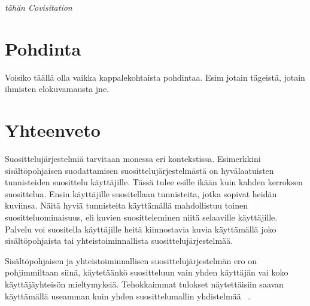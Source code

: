 \documentclass[12pt,finnish]{tktltiki2}
\theoremstyle{definition}
\theoremstyle{remark}
\begin{document}
\textit{tähän Covisitation}

\section{Pohdinta}
Voisiko täällä olla vaikka kappalekohtaista pohdintaa. Esim jotain tägeistä, jotain ihmisten elokuvamausta jne.

        
\section{Yhteenveto}

Suosittelujärjestelmiä tarvitaan monessa eri kontekstissa. Esimerkkini sisältöpohjaisen suodattamisen suosittelujärjestelmästä on hyvälaatuisten tunnisteiden suosittelu käyttäjille. Tässä tulee esille ikään kuin kahden kerroksen suosittelua. Ensin käyttäjille suositellaan tunnisteita, jotka sopivat heidän kuviinsa. Näitä hyviä tunnisteita käyttämällä mahdollistuu toinen suositteluominaisuus, eli kuvien suositteleminen niitä selaaville käyttäjille. Palvelu voi suositella käyttäjille heitä kiinnostavia kuvia käyttämällä joko sisältöpohjaista tai yhteistoiminnallista suosittelujärjestelmää.

Sisältöpohjaisen ja yhteistoiminnallisen suosittelujärjestelmän ero on pohjimmiltaan siinä, käytetäänkö suositteluun vain yhden käyttäjän vai koko käyttäjäyhteisön mieltymyksiä. Tehokkaimmat tulokset näytettäisiin saavan käyttämällä useamman kuin yhden suosittelumallin yhdistelmää ~\cite{Bell:2007:LNP:1345448.1345465}.





%
%
% 
%







 
\end{document}
